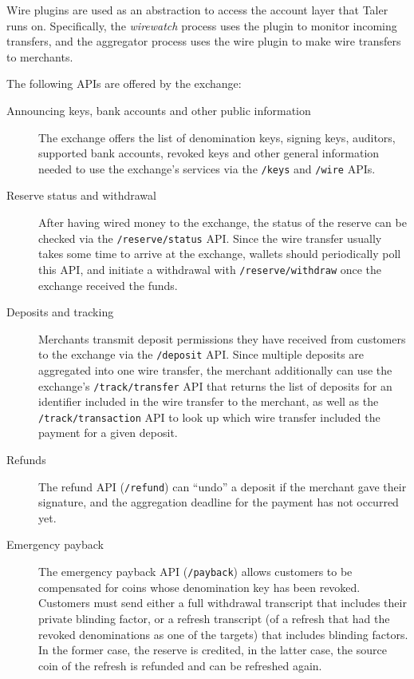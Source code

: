 Wire plugins are used as an abstraction to access the account layer that Taler
runs on.  Specifically, the \textit{wirewatch} process uses the plugin to monitor
incoming transfers, and the aggregator process uses the wire plugin to make
wire transfers to merchants.

The following APIs are offered by the exchange:
\begin{description}
  \item[Announcing keys, bank accounts and other public information]  The
    exchange offers the list of denomination keys, signing keys, auditors,
    supported bank accounts, revoked keys and other general information needed
    to use the exchange's services via the \texttt{/keys} and \texttt{/wire}
    APIs.
  \item[Reserve status and withdrawal] After having wired money to the exchange,
    the status of the reserve can be checked via the \texttt{/reserve/status} API.  Since
    the wire transfer usually takes some time to arrive at the exchange, wallets should periodically
    poll this API, and initiate a withdrawal with \texttt{/reserve/withdraw} once the exchange received the funds.
  \item[Deposits and tracking]  Merchants transmit deposit permissions they have received from customers
    to the exchange via the \texttt{/deposit} API.  Since multiple deposits are aggregated into one wire transfer,
    the merchant additionally can use the exchange's \texttt{/track/transfer} API that returns the list of deposits for an
    identifier included in the wire transfer to the merchant, as well as the \texttt{/track/transaction} API to look up
    which wire transfer included the payment for a given deposit.
  \item[Refunds] The refund API (\texttt{/refund}) can ``undo'' a deposit if the merchant gave their signature, and the aggregation deadline
    for the payment has not occurred yet.
  \item[Emergency payback]  The emergency payback API (\texttt{/payback}) allows customers to be compensated
    for coins whose denomination key has been revoked.  Customers must send either a full withdrawal transcript that
    includes their private blinding factor, or a refresh transcript (of a refresh that had the revoked denominations as one of the targets)
    that includes blinding factors.  In the former case, the reserve is credited, in the latter case, the source coin of the
    refresh is refunded and can be refreshed again.
\end{description}

